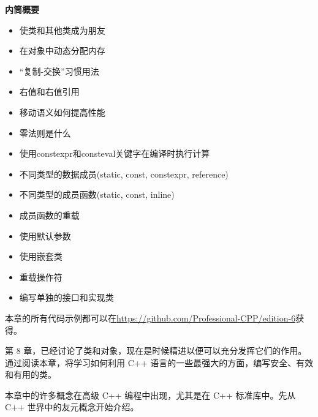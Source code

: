 \noindent
\textbf{内筒概要}

\begin{itemize}
\item
使类和其他类成为朋友

\item
在对象中动态分配内存

\item
“复制-交换”习惯用法

\item
右值和右值引用

\item
移动语义如何提高性能

\item
零法则是什么

\item
使用constexpr和consteval关键字在编译时执行计算

\item
不同类型的数据成员(static, const, constexpr, reference)

\item
不同类型的成员函数(static, const, inline)

\item
成员函数的重载

\item
使用默认参数

\item
使用嵌套类

\item
重载操作符

\item
编写单独的接口和实现类
\end{itemize}

本章的所有代码示例都可以在\url{https://github.com/Professional-CPP/edition-6}获得。

第 8 章，已经讨论了类和对象，现在是时候精进以便可以充分发挥它们的作用。通过阅读本章，将学习如何利用 C++ 语言的一些最强大的方面，编写安全、有效和有用的类。

本章中的许多概念在高级 C++ 编程中出现，尤其是在 C++ 标准库中。先从 C++ 世界中的友元概念开始介绍。














